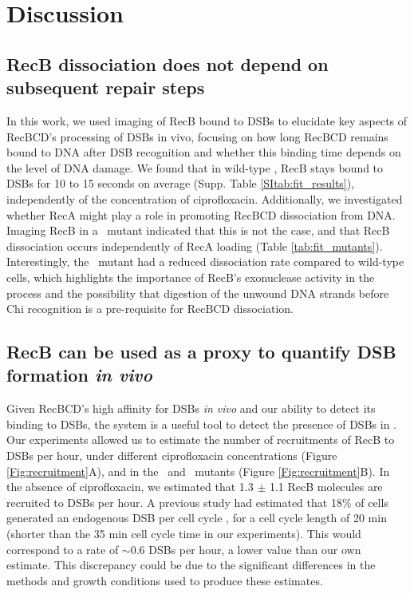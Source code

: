 \section*{Discussion}

\subsection*{RecB dissociation does not depend on subsequent repair steps}
In this work, we used imaging of RecB bound to DSBs to elucidate key aspects of RecBCD's processing of DSBs in vivo, focusing on how long RecBCD remains bound to DNA after DSB recognition and whether this binding time depends on the level of DNA damage. We found that in wild-type \ecoli, RecB stays bound to DSBs for 10 to 15 seconds on average (Supp. Table \ref{SItab:fit_results}), independently of the concentration of ciprofloxacin. Additionally, we investigated whether RecA might play a role in promoting RecBCD dissociation from DNA. Imaging RecB in a \dreca\ mutant indicated that this is not the case, and that RecB dissociation occurs independently of RecA loading (Table \ref{tab:fit_mutants}). Interestingly, the \geneteneighty\ mutant had a reduced dissociation rate compared to wild-type cells, which highlights the importance of RecB's exonuclease activity in the process and the possibility that digestion of the unwound DNA strands before Chi recognition is a pre-requisite for RecBCD dissociation.

\subsection*{RecB can be used as a proxy to quantify DSB formation \emph{in vivo}}
Given RecBCD's high affinity for DSBs \emph{in vivo} and our ability to detect its binding to DSBs, the system is a useful tool to detect the presence of DSBs in \ecoli. Our experiments allowed us to estimate the number of recruitments of RecB to DSBs per hour, under different ciprofloxacin concentrations (Figure \ref{Fig:recruitment}A), and in the \dreca\ and \geneteneighty\ mutants (Figure \ref{Fig:recruitment}B). In the absence of ciprofloxacin, we estimated that 1.3 $\pm$ 1.1 RecB molecules are recruited to DSBs per hour. A previous study had estimated that 18\% of cells generated an endogenous DSB per cell cycle \cite{Sinha2018}, for a cell cycle length of 20 min (shorter than the 35 min cell cycle time in our experiments). This would correspond to a rate of $\sim$0.6 DSBs per hour, a lower value than our own estimate. This discrepancy could be due to the significant differences in the methods and growth conditions used to produce these estimates.

